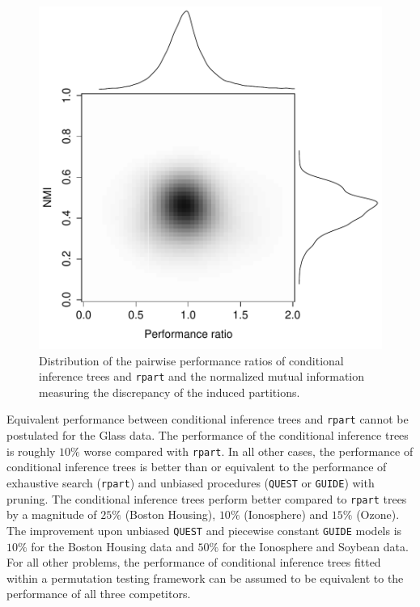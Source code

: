 \begin{figure}[t]
\begin{center}
\includegraphics[width = 12cm]{nmiratiodens}
\caption{Distribution of the pairwise performance ratios of conditional
         inference trees and \texttt{rpart} and the normalized mutual
         information measuring the discrepancy of the induced partitions. 
         \label{densfig}}
\end{center}
\end{figure}


Equivalent performance between conditional inference trees and
\texttt{rpart} cannot be postulated for the Glass data. The
performance of the conditional inference trees is
roughly $10\%$ worse compared with \texttt{rpart}. In all other cases, the
performance of conditional inference trees is better than or equivalent to the
performance of exhaustive search (\texttt{rpart}) and unbiased procedures
(\texttt{QUEST} or \texttt{GUIDE}) with pruning.
The conditional inference trees 
perform better compared to \texttt{rpart} trees by a magnitude of $25\%$ (Boston
Housing), $10\%$ (Ionosphere) and $15\%$ (Ozone). The improvement upon
unbiased \texttt{QUEST} and piecewise constant \texttt{GUIDE} models 
is $10\%$ for the Boston Housing data and $50\%$ for the
Ionosphere and Soybean data.
For all other problems, the performance of conditional inference trees 
fitted within a permutation testing framework can
be assumed to be equivalent to the performance of all three competitors. 

